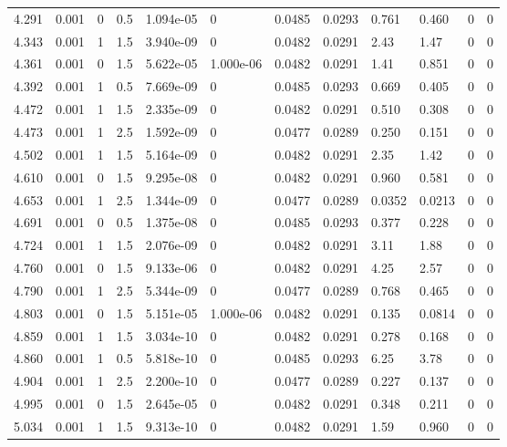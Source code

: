 \documentclass[preview]{standalone}
\begin{document}
{{{{\begin{tabular}{L{1.2cm}C{1.2cm} C{0.3cm}C{0.5cm} C{1.4cm}C{1.4cm} C{1.4cm}C{1.4cm} C{1.6cm}C{1.6cm} C{1.6cm}C{1.6cm}}
  4.291  &  0.001  & 0     & 0.5 &  1.094e-05  & 0  &  0.0485&   0.0293& 0.761 & 0.460   &  0 & 0  \\ 
  4.343  &  0.001  & 1     & 1.5 &  3.940e-09  & 0  &  0.0482&   0.0291& 2.43 & 1.47   &  0 & 0  \\ 
  4.361  &  0.001  & 0     & 1.5 &  5.622e-05  & 1.000e-06  &  0.0482&   0.0291& 1.41 & 0.851   &  0 & 0  \\ 
  4.392  &  0.001  & 1     & 0.5 &  7.669e-09  & 0  &  0.0485&   0.0293& 0.669 & 0.405   &  0 & 0  \\ 
  4.472  &  0.001  & 1     & 1.5 &  2.335e-09  & 0  &  0.0482&   0.0291& 0.510 & 0.308   &  0 & 0  \\ 
  4.473  &  0.001  & 1     & 2.5 &  1.592e-09  & 0  &  0.0477&   0.0289& 0.250 & 0.151   &  0 & 0  \\ 
  4.502  &  0.001  & 1     & 1.5 &  5.164e-09  & 0  &  0.0482&   0.0291& 2.35 & 1.42   &  0 & 0  \\ 
  4.610  &  0.001  & 0     & 1.5 &  9.295e-08  & 0  &  0.0482&   0.0291& 0.960 & 0.581   &  0 & 0  \\ 
  4.653  &  0.001  & 1     & 2.5 &  1.344e-09  & 0  &  0.0477&   0.0289& 0.0352 & 0.0213   &  0 & 0  \\ 
  4.691  &  0.001  & 0     & 0.5 &  1.375e-08  & 0  &  0.0485&   0.0293& 0.377 & 0.228   &  0 & 0  \\ 
  4.724  &  0.001  & 1     & 1.5 &  2.076e-09  & 0  &  0.0482&   0.0291& 3.11 & 1.88   &  0 & 0  \\ 
  4.760  &  0.001  & 0     & 1.5 &  9.133e-06  & 0  &  0.0482&   0.0291& 4.25 & 2.57   &  0 & 0  \\ 
  4.790  &  0.001  & 1     & 2.5 &  5.344e-09  & 0  &  0.0477&   0.0289& 0.768 & 0.465   &  0 & 0  \\ 
  4.803  &  0.001  & 0     & 1.5 &  5.151e-05  & 1.000e-06  &  0.0482&   0.0291& 0.135 & 0.0814   &  0 & 0  \\ 
  4.859  &  0.001  & 1     & 1.5 &  3.034e-10  & 0  &  0.0482&   0.0291& 0.278 & 0.168   &  0 & 0  \\ 
  4.860  &  0.001  & 1     & 0.5 &  5.818e-10  & 0  &  0.0485&   0.0293& 6.25 & 3.78   &  0 & 0  \\ 
  4.904  &  0.001  & 1     & 2.5 &  2.200e-10  & 0  &  0.0477&   0.0289& 0.227 & 0.137   &  0 & 0  \\ 
  4.995  &  0.001  & 0     & 1.5 &  2.645e-05  & 0  &  0.0482&   0.0291& 0.348 & 0.211   &  0 & 0  \\ 
  5.034  &  0.001  & 1     & 1.5 &  9.313e-10  & 0  &  0.0482&   0.0291& 1.59 & 0.960   &  0 & 0  \\ 

\end{tabular}}}}}
\end{document}
